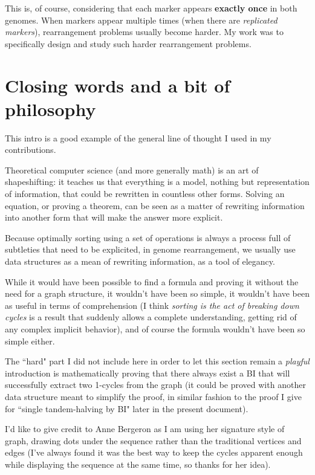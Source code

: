 \documentclass[11pt,final,twoside,nofrench]{thlifl}
\begin{document}
This is, of course, considering that each marker appears \textbf{exactly once} in both genomes. When markers appear multiple times (when there are \emph{replicated markers}), rearrangement problems usually become harder. My work was to specifically design and study such harder rearrangement problems.

\section{Closing words and a bit of philosophy}

This intro is a good example of the general line of thought I used in my contributions.

Theoretical computer science (and more generally math) is an art of shapeshifting: it teaches us that everything is a model, nothing but representation of information, that could be rewritten in countless other forms. Solving an equation, or proving a theorem, can be seen as a matter of rewriting information into another form that will make the answer more explicit.

Because optimally sorting using a set of operations is always a process full of subtleties that need to be explicited, in genome rearrangement, we usually use data structures as a mean of rewriting information, as a tool of elegancy.

While it would have been possible to find a formula and proving it without the need for a graph structure, it wouldn't have been so simple, it wouldn't have been as useful in terms of comprehension (I think \emph{sorting is the act of breaking down cycles} is a result that suddenly allows a complete understanding, getting rid of any complex implicit behavior), and of course the formula wouldn't have been so simple either.

The ``hard" part I did not include here in order to let this section remain a \emph{playful} introduction is mathematically proving that there always exist a BI that will successfully extract two 1-cycles from the graph (it could be proved with another data structure meant to simplify the proof, in similar fashion to the proof I give for ``single tandem-halving by BI" later in the present document).

I'd like to give credit to Anne Bergeron as I am using her signature style of graph, drawing dots under the sequence rather than the traditional vertices and edges (I've always found it was the best way to keep the cycles apparent enough while displaying the sequence at the same time, so thanks for her idea).
\end{document}
